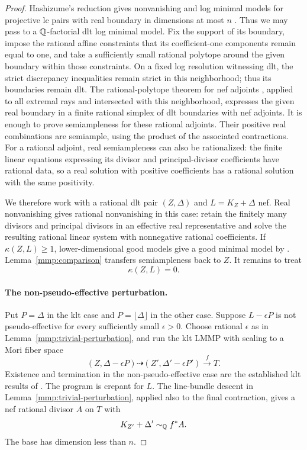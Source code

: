 \begin{proof}
Hashizume's reduction gives nonvanishing and log minimal models
for projective lc pairs with real boundary in dimensions at most
\(n\) \cite[Theorem~1.4]{Hashizume2018}.
Thus we may pass to a \(\mathbb{Q}\)-factorial dlt log minimal model.
Fix the support of its boundary, impose the rational affine
constraints that its coefficient-one components remain equal
to one, and take a sufficiently small rational polytope around
the given boundary within those constraints. On a fixed log
resolution witnessing dlt, the strict discrepancy inequalities
remain strict in this neighborhood; thus its boundaries remain
dlt. The rational-polytope theorem for nef adjoints
\cite[Remark~3.1 and Proposition~3.2(3)]{Birkar2011II}, applied
to all extremal rays and intersected with this neighborhood,
expresses the given real boundary in a finite rational simplex
of dlt boundaries with nef adjoints.
It is enough to prove semiampleness for these
rational adjoints. Their positive real combinations are
semiample, using the product of the associated contractions.
For a rational adjoint, real semiampleness can also be
rationalized: the finite linear equations expressing its
divisor and principal-divisor coefficients have rational data,
so a real solution with positive coefficients has a rational
solution with the same positivity.

We therefore work with a rational dlt pair \((Z,\Delta)\) and
\(L=K_Z+\Delta\) nef.
Real nonvanishing gives rational nonvanishing in this case:
retain the finitely many divisors and principal divisors in
an effective real representative and solve the resulting
rational linear system with nonnegative rational coefficients.
If \(\kappa(Z,L)\geq 1\), lower-dimensional good models give a
good minimal model by \cite[Lemma~3.5]{FujinoGongyoRings2014}.
Lemma~\ref{mmp:comparison} transfers semiampleness back to \(Z\).
It remains to treat
\[
 \kappa(Z,L)=0.
\]

\paragraph{The non-pseudo-effective perturbation.}
Put \(P=\Delta\) in the klt case and
\(P=\lfloor\Delta\rfloor\) in the other case.
Suppose \(L-\epsilon P\) is not pseudo-effective for every
sufficiently small \(\epsilon>0\).
Choose rational \(\epsilon\) as in
Lemma~\ref{mmp:trivial-perturbation}, and run the klt LMMP
with scaling to a Mori fiber space
\[
 (Z,\Delta-\epsilon P)\dashrightarrow
 (Z',\Delta'-\epsilon P')\xrightarrow{f} T.
\]
Existence and termination in the non-pseudo-effective case are
the established klt results of \cite{BCHM2010}.
The program is crepant for \(L\).
The line-bundle descent in
Lemma~\ref{mmp:trivial-perturbation}, applied also to the final
contraction, gives a nef rational divisor \(A\) on \(T\) with
\[
 K_{Z'}+\Delta'\sim_{\mathbb{Q}}f^*A.
\]
The base has dimension less than \(n\).


\end{proof}

